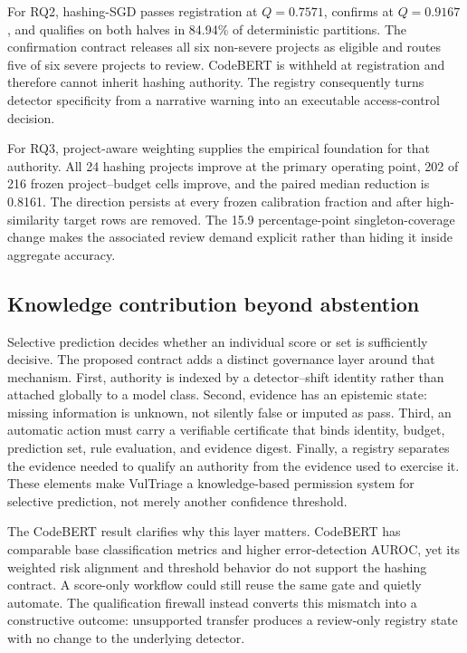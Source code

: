 \documentclass[preprint,12pt]{elsarticle}
\newcommand{\method}{VulTriage\xspace}
\begin{document}
For RQ2, hashing-SGD passes registration at $Q=0.7571$, confirms at $Q=0.9167$, and qualifies on both halves in 84.94\% of deterministic partitions. The confirmation contract releases all six non-severe projects as eligible and routes five of six severe projects to review. CodeBERT is withheld at registration and therefore cannot inherit hashing authority. The registry consequently turns detector specificity from a narrative warning into an executable access-control decision.

For RQ3, project-aware weighting supplies the empirical foundation for that authority. All 24 hashing projects improve at the primary operating point, 202 of 216 frozen project--budget cells improve, and the paired median reduction is 0.8161. The direction persists at every frozen calibration fraction and after high-similarity target rows are removed. The 15.9 percentage-point singleton-coverage change makes the associated review demand explicit rather than hiding it inside aggregate accuracy.

\subsection{Knowledge contribution beyond abstention}

Selective prediction decides whether an individual score or set is sufficiently decisive. The proposed contract adds a distinct governance layer around that mechanism. First, authority is indexed by a detector--shift identity rather than attached globally to a model class. Second, evidence has an epistemic state: missing information is unknown, not silently false or imputed as pass. Third, an automatic action must carry a verifiable certificate that binds identity, budget, prediction set, rule evaluation, and evidence digest. Finally, a registry separates the evidence needed to qualify an authority from the evidence used to exercise it. These elements make \method a knowledge-based permission system for selective prediction, not merely another confidence threshold.

The CodeBERT result clarifies why this layer matters. CodeBERT has comparable base classification metrics and higher error-detection AUROC, yet its weighted risk alignment and threshold behavior do not support the hashing contract. A score-only workflow could still reuse the same gate and quietly automate. The qualification firewall instead converts this mismatch into a constructive outcome: unsupported transfer produces a review-only registry state with no change to the underlying detector.
\end{document}
